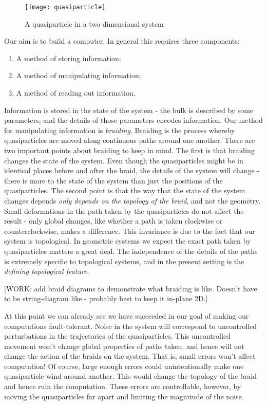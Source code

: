\begin{figure}[h]
\begin{center}
\texttt{[image: quasiparticle]}
\end{center}
\caption{A quasiparticle in a two dimensional system}
\end{figure}

Our aim is to build a computer. In general this requires three components:

\begin{enumerate}
\item A method of storing information;
\item A method of manipulating information;
\item A method of reading out information.
\end{enumerate}

Information is stored in the state of the system - the bulk is described by some parameters, and the details of those parameters encodes information. Our method for manipulating information is \textit{braiding}. Braiding is the process whereby quasiparticles are moved along continuous paths around one another. There are two important points about braiding to keep in mind. The first is that braiding changes the state of the system. Even though the quasiparticles might be in identical places before and after the braid, the details of the system will change - there is more to the state of the system than just the positions of the quasiparticles. The second point is that the way that the state of the system changes depends \textit{only depends on the topology of the braid}, and not the geometry. Small deformations in the path taken by the quasiparticles do not affect the result - only global changes, like whether a path is taken clockwise or counterclockwise, makes a difference. This invariance is due to the fact that our system is topological. In geometric systems we expect the exact path taken by quasiparticles matters a great deal. The independence of the details of the paths is extremely specific to topological systems, and in the present setting is the \textit{defining topological feature}.

[WORK: add braid diagrams to demonstrate what braiding is like. Doesn't have to be string-diagram like - probably best to keep it in-plane 2D.]

At this point we can already see we have succeeded in our goal of making our computations fault-tolerant. Noise in the system will correspond to uncontrolled perturbations in the trajectories of the quasiparticles. This uncontrolled movement won’t change global properties of paths taken, and hence will not change the action of the braids on the system. That is, small errors won't affect computation! Of course, large enough errors could unintentionally make one quasiparticle wind around another. This would change the topology of the braid and hence ruin the computation. These errors are controllable, however, by moving the quasiparticles far apart and limiting the magnitude of the noise.

